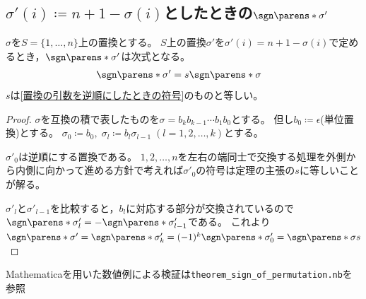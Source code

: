         \subsection{\texorpdfstring{$\sigma'(i) \coloneq n+1-\sigma(i)$としたときの$\sgn\parens*{\sigma'}$}{σ'(i) := n+1-σ(i)おしたときのsgn(σ')}}
            \label{出力を逆順にしたときの置換の符号}
            \begin{shadebox}
                $\sigma$を$S=\{1,\dotsc,n\}$上の置換とする。
                $S$上の置換$\sigma'$を$\sigma'(i) = n+1-\sigma(i)$で定めるとき，$\sgn\parens*{\sigma'}$は次式となる。
                \begin{align*}
                    \sgn\parens*{\sigma'} &= s\sgn\parens*{\sigma}
                \end{align*}
                $s$は\ref{置換の引数を逆順にしたときの符号}のものと等しい。
            \end{shadebox}
            \begin{proof}
                \quad\par
                $\sigma$を互換の積で表したものを$\sigma=b_k b_{k-1}\dotsm b_1 b_0$とする。
                但し$b_0 \coloneq \epsilon$(単位置換)とする。
                $\sigma_0 \coloneq b_0,\;\sigma_l \coloneq b_l\sigma_{l-1}\;(l=1,2,\dotsc,k)$とする。
                \par
                $\sigma'_0$は逆順にする置換である。
                $1,2,\dotsc,n$を左右の端同士で交換する処理を外側から内側に向かって進める方針で考えれば$\sigma'_0$の符号は定理の主張の$s$に等しいことが解る。
                \par
                $\sigma'_l$と$\sigma'_{l-1}$を比較すると，$b_l$に対応する部分が交換されているので$\sgn\parens*{\sigma'_l} = -\sgn\parens*{\sigma'_{l-1}}$である。
                これより$\sgn\parens*{\sigma'} = \sgn\parens*{\sigma'_k} = (-1)^k\sgn\parens*{\sigma'_0} = \sgn\parens*{\sigma} s$
            \end{proof}
            Mathematicaを用いた数値例による検証は\verb|theorem_sign_of_permutation.nb|を参照